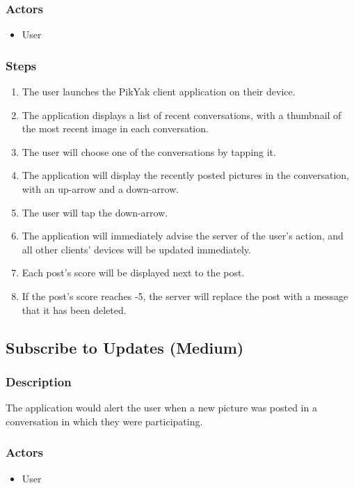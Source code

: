 \documentclass[11pt]{scrartcl}
\begin{document}
        \subsubsection{Actors}
            \begin{itemize}
                \item User
            \end{itemize}
        \subsubsection{Steps}
            \begin{enumerate}
                \item The user launches the PikYak client application on their device.
                \item The application displays a list of recent conversations, with a thumbnail of the most recent image in each conversation.
                \item The user will choose one of the conversations by tapping it.
                \item The application will display the recently posted pictures in the conversation, with an up-arrow and a down-arrow.
                \item The user will tap the down-arrow.
                \item The application will immediately advise the server of the user's action, and all other clients' devices will be updated immediately.
                \item Each post's score will be displayed next to the post.
                \item If the post's score reaches -5, the server will replace the post with a message that it has been deleted.
            \end{enumerate}

    \subsection{Subscribe to Updates (Medium)}
        \subsubsection{Description}
            The application would alert the user when a new picture was posted in a conversation in which they were participating.
        \subsubsection{Actors}
            \begin{itemize}
                \item User
            \end{itemize}
\end{document}
